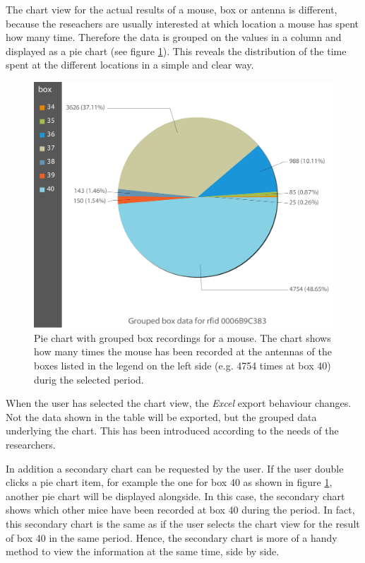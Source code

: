 The chart view for the actual results of a mouse, box or antenna is different, because the reseachers are usually interested at which location a mouse has spent how many time. Therefore the data is grouped on the values in a column and displayed as a pie chart (see figure \ref{fig:pie_chart_for_mouse}). This reveals the distribution of the time spent at the different locations in a simple and clear way. 

\begin{figure}[htpb]
\begin{center}
  \includegraphics[width=.66\textwidth]{assets/img/pie_chart_for_mouse.png}
  \caption[Pie chart of result data for a mouse]{Pie chart with grouped box recordings for a mouse. The chart shows how many times the mouse has been recorded at the antennas of the boxes listed in the legend on the left side (e.g. 4754 times at box 40) durig the selected period.}
  \label{fig:pie_chart_for_mouse}
\end{center}
\end{figure}

When the user has selected the chart view, the \textit{Excel} export behaviour changes. Not the data shown in the table will be exported, but the grouped data underlying the chart. This has been introduced according to the needs of the researchers.

In addition a secondary chart can be requested by the user. If the user double clicks a pie chart item, for example the one for box 40 as shown in figure \ref{fig:pie_chart_for_mouse}, another pie chart will be displayed alongside. In this case, the secondary chart shows which other mice have been recorded at box 40 during the period. In fact, this secondary chart is the same as if the user selects the chart view for the result of box 40 in the same period. Hence, the secondary chart is more of a handy method to view the information at the same time, side by side.

